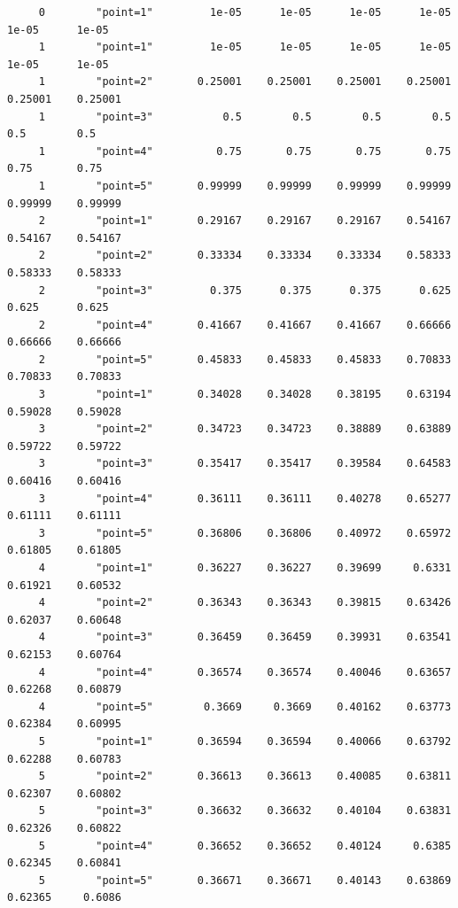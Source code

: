 \documentclass[
]{book}
\begin{document}
\begin{verbatim}
     0        "point=1"         1e-05      1e-05      1e-05      1e-05      1e-05      1e-05
     1        "point=1"         1e-05      1e-05      1e-05      1e-05      1e-05      1e-05
     1        "point=2"       0.25001    0.25001    0.25001    0.25001    0.25001    0.25001
     1        "point=3"           0.5        0.5        0.5        0.5        0.5        0.5
     1        "point=4"          0.75       0.75       0.75       0.75       0.75       0.75
     1        "point=5"       0.99999    0.99999    0.99999    0.99999    0.99999    0.99999
     2        "point=1"       0.29167    0.29167    0.29167    0.54167    0.54167    0.54167
     2        "point=2"       0.33334    0.33334    0.33334    0.58333    0.58333    0.58333
     2        "point=3"         0.375      0.375      0.375      0.625      0.625      0.625
     2        "point=4"       0.41667    0.41667    0.41667    0.66666    0.66666    0.66666
     2        "point=5"       0.45833    0.45833    0.45833    0.70833    0.70833    0.70833
     3        "point=1"       0.34028    0.34028    0.38195    0.63194    0.59028    0.59028
     3        "point=2"       0.34723    0.34723    0.38889    0.63889    0.59722    0.59722
     3        "point=3"       0.35417    0.35417    0.39584    0.64583    0.60416    0.60416
     3        "point=4"       0.36111    0.36111    0.40278    0.65277    0.61111    0.61111
     3        "point=5"       0.36806    0.36806    0.40972    0.65972    0.61805    0.61805
     4        "point=1"       0.36227    0.36227    0.39699     0.6331    0.61921    0.60532
     4        "point=2"       0.36343    0.36343    0.39815    0.63426    0.62037    0.60648
     4        "point=3"       0.36459    0.36459    0.39931    0.63541    0.62153    0.60764
     4        "point=4"       0.36574    0.36574    0.40046    0.63657    0.62268    0.60879
     4        "point=5"        0.3669     0.3669    0.40162    0.63773    0.62384    0.60995
     5        "point=1"       0.36594    0.36594    0.40066    0.63792    0.62288    0.60783
     5        "point=2"       0.36613    0.36613    0.40085    0.63811    0.62307    0.60802
     5        "point=3"       0.36632    0.36632    0.40104    0.63831    0.62326    0.60822
     5        "point=4"       0.36652    0.36652    0.40124     0.6385    0.62345    0.60841
     5        "point=5"       0.36671    0.36671    0.40143    0.63869    0.62365     0.6086
\end{verbatim}
\end{document}
